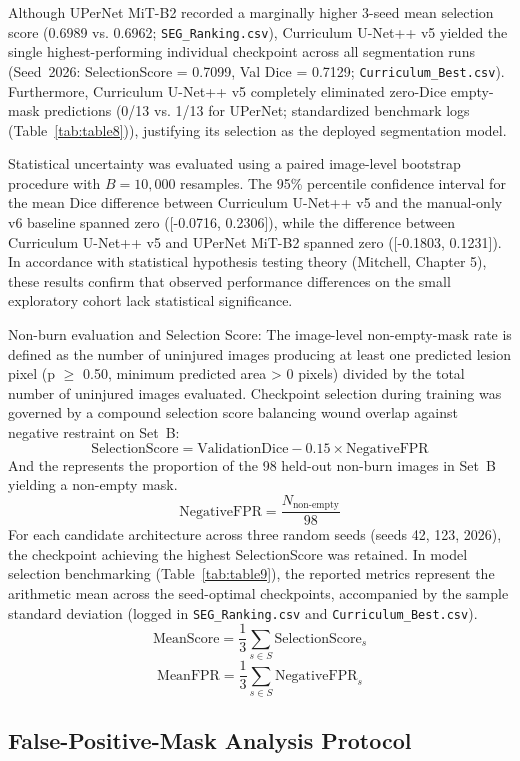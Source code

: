\documentclass[11pt,a4paper]{article}
\begin{document}
Although UPerNet MiT-B2 recorded a marginally higher 3-seed mean selection score (0.6989 vs. 0.6962; \texttt{SEG\_Ranking.csv}), Curriculum U-Net++ v5 yielded the single highest-performing individual checkpoint across all segmentation runs (Seed~2026: SelectionScore = 0.7099, Val Dice = 0.7129; \texttt{Curriculum\_Best.csv}). Furthermore, Curriculum U-Net++ v5 completely eliminated zero-Dice empty-mask predictions (0/13 vs. 1/13 for UPerNet; standardized benchmark logs (Table~\ref{tab:table8})), justifying its selection as the deployed segmentation model.

Statistical uncertainty was evaluated using a paired image-level bootstrap procedure with $B = 10{,}000$ resamples. The 95\% percentile confidence interval for the mean Dice difference between Curriculum U-Net++ v5 and the manual-only v6 baseline spanned zero ([-0.0716, 0.2306]), while the difference between Curriculum U-Net++ v5 and UPerNet MiT-B2 spanned zero ([-0.1803, 0.1231]). In accordance with statistical hypothesis testing theory (Mitchell, Chapter 5), these results confirm that observed performance differences on the small exploratory cohort lack statistical significance.

Non-burn evaluation and Selection Score: The image-level non-empty-mask rate is defined as the number of uninjured images producing at least one predicted lesion pixel (p $\ge$ 0.50, minimum predicted area > 0 pixels) divided by the total number of uninjured images evaluated. Checkpoint selection during training was governed by a compound selection score balancing wound overlap against negative restraint on Set~B: 
$$\text{SelectionScore} = \text{ValidationDice} - 0.15 \times \text{NegativeFPR}$$
And the  represents the proportion of the 98 held-out non-burn images in Set~B yielding a non-empty mask.
$$\text{NegativeFPR} = \frac{N_{\text{non-empty}}}{98}$$
For each candidate architecture across three random seeds (seeds 42, 123, 2026), the checkpoint achieving the highest SelectionScore was retained. In model selection benchmarking (Table~\ref{tab:table9}), the reported metrics represent the arithmetic mean across the seed-optimal checkpoints, accompanied by the sample standard deviation (logged in \texttt{SEG\_Ranking.csv} and \texttt{Curriculum\_Best.csv}). 
$$\text{MeanScore} = \frac{1}{3} \sum_{s \in S} \text{SelectionScore}_s$$
$$\text{MeanFPR} = \frac{1}{3} \sum_{s \in S} \text{NegativeFPR}_s$$

\subsection{False-Positive-Mask Analysis Protocol}
\end{document}
